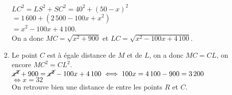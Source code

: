 \begin{enumerate}
\begin{enumerate}
            $LC^2 =LS^2+SC^2 =40^2+(50-x)^2$ \\
            \hspace*{2.53cm} $=1\,600+(2\,500-100x+x^2)$ \\
            \hspace*{2.53cm} $=x^2-100x+4\,100$. \\ [1mm]
            On a donc {\blue $MC =\sqrt{x^2+900}$ et $LC =\sqrt{x^2-100x+4\,100}$}.
         \item Le point $C$ est à égale distance de $M$ et de $L$, on a donc $MC =CL$, on encore $MC^2 =CL^2$. \\
            $\cancel{x^2}+900 =\cancel{x^2}-100x+4\,100 \iff 100x =4\,100-900 =3\,200$ \\
            \hspace*{4.15cm} $\iff x =32$ \\
            {\blue On retrouve bien une distance de  entre les points $R$ et $C$}.
      \end{enumerate}
   \end{enumerate}
